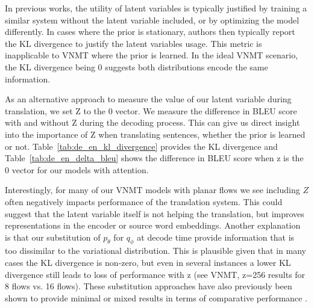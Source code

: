 
In previous works, the utility of latent variables is typically justified by training a similar system without the latent variable included, or by optimizing the model differently.  In cases where the prior is stationary, authors then typically report the KL divergence to justify the latent variables usage. This metric is inapplicable to \ac{VNMT} where the prior is learned. In the ideal \ac{VNMT} scenario, the KL divergence being 0 suggests both distributions encode the same information.

As an alternative approach to measure the value of our latent variable during translation, we set Z to the 0 vector. We measure the difference in BLEU score with and without Z during the decoding process. This can give us direct insight into the importance of Z when translating sentences, whether the prior is learned or not. Table~\ref{tab:de_en_kl_divergence} provides the KL divergence and Table~\ref{tab:de_en_delta_bleu} shows the difference in BLEU score when z is the 0 vector for our models with attention. 

Interestingly, for many of our \ac{VNMT} models with planar flows we see including $Z$ often negatively impacts performance of the translation system. This could suggest that the latent variable itself is not helping the translation, but improves representations in the encoder or source word embeddings. Another explanation is that our substitution of $p_{\theta}$ for $q_{\phi}$ at decode time provide information that is too dissimilar to the variational distribution. This is plausible given that in many cases the KL divergence is non-zero, but even in several instances a lower KL divergence still leads to loss of performance with z (see \ac{VNMT}, z=256 results for 8 flows vs. 16 flows). These substitution approaches have also previously been shown to provide minimal or mixed results in terms of comparative performance \cite{eikema2018AEVNMT}.

